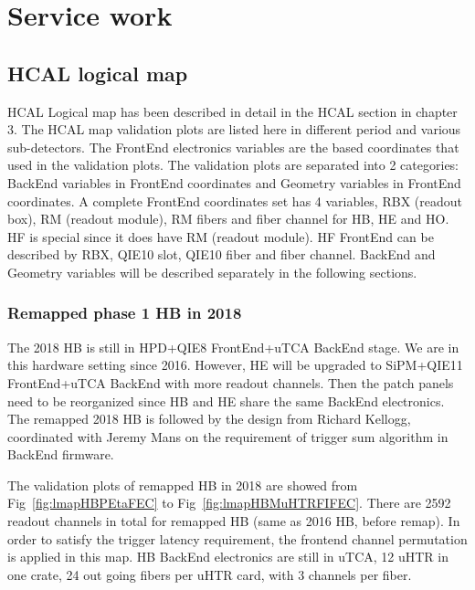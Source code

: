 \chapter{Service work}
\clearpage

\section{HCAL logical map}
HCAL Logical map has been described in detail in the HCAL section in chapter 3. The HCAL map validation plots are listed here in different period and various sub-detectors. The FrontEnd electronics variables are the based coordinates that used in the validation plots. The validation plots are separated into 2 categories: BackEnd variables in FrontEnd coordinates and Geometry variables in FrontEnd coordinates. A complete FrontEnd coordinates set has 4 variables, RBX (readout box), RM (readout module), RM fibers and fiber channel for HB, HE and HO. HF is special since it does have RM (readout module). HF FrontEnd can be described by RBX, QIE10 slot, QIE10 fiber and fiber channel. BackEnd and Geometry variables will be described separately in the following sections.
\clearpage

\subsection{Remapped phase 1 HB in 2018}
The 2018 HB is still in HPD+QIE8 FrontEnd+uTCA BackEnd stage. We are in this hardware setting since 2016. However, HE will be upgraded to SiPM+QIE11 FrontEnd+uTCA BackEnd with more readout channels. Then the patch panels need to be reorganized since HB and HE share the same BackEnd electronics. The remapped 2018 HB is followed by the design from Richard Kellogg, coordinated with Jeremy Mans on the requirement of trigger sum algorithm in BackEnd firmware. 

The validation plots of remapped HB in 2018 are showed from Fig~\ref{fig:lmapHBPEtaFEC} to Fig~\ref{fig:lmapHBMuHTRFIFEC}. There are 2592 readout channels in total for remapped HB (same as 2016 HB, before remap). In order to satisfy the trigger latency requirement, the frontend channel permutation is applied in this map. HB BackEnd electronics are still in uTCA, 12 uHTR in one crate, 24 out going fibers per uHTR card, with 3 channels per fiber. 
\clearpage

